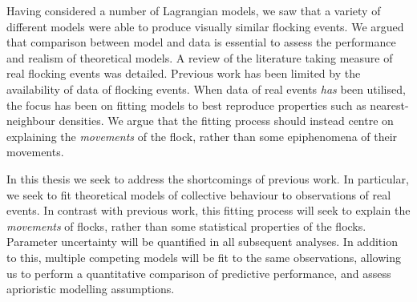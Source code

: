 Having considered a number of Lagrangian models, we saw that a variety of
different models were able to produce visually similar flocking events. We
argued that comparison between model and data is essential to assess the
performance and realism of theoretical models. A review of the literature
taking measure of real flocking events was detailed. Previous work has been
limited by the availability of data of flocking events. When data of real
events \emph{has} been utilised, the focus has been on fitting models to best
reproduce properties such as nearest-neighbour densities. We argue that the
fitting process should instead centre on explaining the \emph{movements} of the
flock, rather than some epiphenomena of their movements.

In this thesis we seek to address the shortcomings of previous work. In
particular, we seek to fit theoretical models of collective behaviour to
observations of real events. In contrast with previous work, this fitting
process will seek to explain the \emph{movements} of flocks, rather than some
statistical properties of the flocks. Parameter uncertainty will be quantified
in all subsequent analyses. In addition to this, multiple competing models will
be fit to the same observations, allowing us to perform a quantitative
comparison of predictive performance, and assess aprioristic modelling
assumptions.
